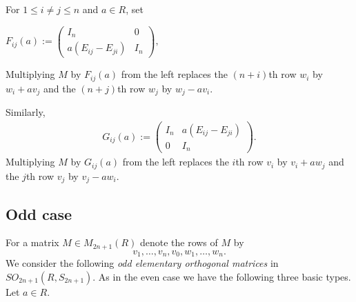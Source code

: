 \documentclass[11pt]{amsart}
\newtheorem{lemma}[theorem]{Lemma}
\theoremstyle{definition}
\theoremstyle{remark}
\theoremstyle{remark}
\begin{document}
\smallskip

For $1\le i \neq j\le n$ and $a\in R$, set
\begin{center}
$F_{ij}(a):=
\begin{pmatrix}
I_n & 0\\
a(E_{ij}-E_{ji}) & I_n
\end{pmatrix}, $
\end{center}
Multiplying $M$ by $F_{ij}(a)$ from the left replaces the $(n+i)$th row $w_i$ by $w_i+a v_j$ and the $(n+j)$th row $w_j$ by $w_j-a v_i$. 

Similarly,
\begin{align*}
    G_{ij}(a):= \begin{pmatrix}
                I_n & a(E_{ij}-E_{ji})\\
                0 & I_n
                \end{pmatrix}.
\end{align*}
Multiplying $M$ by $G_{ij}(a)$ from the left replaces the $i$th row $v_i$ by $v_i+a w_j$ and the $j$th row $v_j$ by $v_j-a w_i$.





\subsection{Odd case}
For a matrix $M \in M_{2n+1}(R)$ denote the rows of $M$ by $$v_1,\dots,v_n, v_0, w_1,\dots,w_n. $$
We consider the following \emph{odd elementary orthogonal matrices} in $SO_{2n+1}(R, S_{2n+1})$. As in the even case we have the following three basic types. Let $a \in R$.
\end{document}
